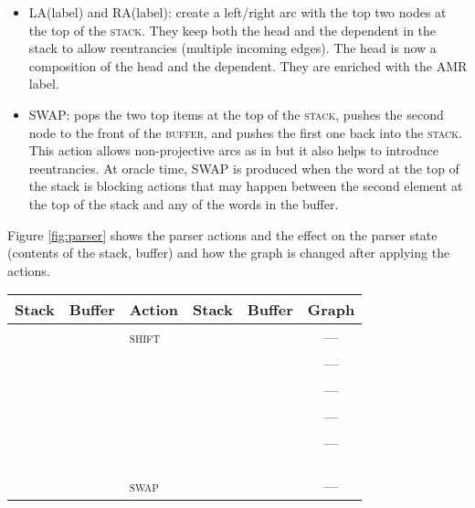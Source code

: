 \documentclass[11pt,a4paper]{article}
\begin{document}
\begin{itemize}
  \item \textsc{LA}(label) and  \textsc{RA}(label): create a left/right arc with the top two 
  nodes at the top of the \textsc{stack}. They keep both the head and the dependent in the stack to allow 
  reentrancies (multiple incoming edges). The head is now a composition of the head and the dependent. 
  They are enriched with the AMR label.
    
   \item \textsc{SWAP}:  pops the two top items at the top of the \textsc{stack}, pushes the second node to 
   the front of the \textsc{buffer}, and pushes the first one back into the
    \textsc{stack}.  This action allows non-projective arcs as in \cite{nivre2009non} 
    but it also helps to introduce reentrancies.
    At oracle time, \textsc{SWAP} is produced when the word at the top of the stack is blocking actions that 
    may happen between the second element at the top of the stack and any of the words in the buffer.    
\end{itemize}

Figure \ref{fig:parser} shows the parser actions and the effect on the parser 
state (contents of the stack, buffer) and how the graph is changed after 
applying the actions.


\begin{figure*}
\centering
\begin{tabular}{cc|l|cc|c}
\textbf{Stack} & \textbf{Buffer} & \textbf{Action} & \textbf{Stack} & \textbf{Buffer} & \textbf{Graph} \\
\hline
 &  & \textsc{shift} &  &  & --- \\ 
 &   & &  &  & ---   \\
 &   & &  &  & --- \\
 &   & &  &  &  ---   \\
 &   & &  &  & --- \\
 &   & &  &  &   \\
 &   & &  &  &    \\
 &  &  &  &  &   \\
 &  & \textsc{swap} &  &  & ---   
\end{tabular}
\caption{\label{fig:parser}Parser transitions indicating the action applied to the stack and buffer and 
the resulting state. }
\end{figure*}
 
\end{document}
